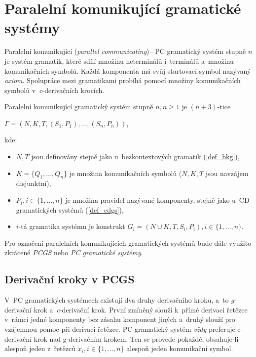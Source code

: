 \section{Paralelní komunikující gramatické systémy}
Paralelní komunikující (\emph{parallel communicating})\,--\,PC gramatický systém stupně $n$ je systém gramatik, které sdílí množinu neterminálů i~terminálů a~množinu komunikačních symbolů.
Každá komponenta má svůj startovací symbol nazývaný \emph{axiom}.
Spolupráce mezi gramatikami probíhá pomocí množiny komunikačních symbolů v~\emph{c}-derivačních krocích.
\begin{definition}
    Paralelní komunikující gramatický systém stupně $n, n \geq 1$ je $(n+3)$-tice
    \begin{center}
        $\Gamma = (N, K, T, (S_1, P_1), \ldots, (S_n, P_n))$,
    \end{center}
    kde:
    \begin{itemize}
        \item $N, T$ jsou definovány stejně jako u~bezkontextových gramatik (\ref{def_bkg}),
        \item $K = \{Q_1, \ldots, Q_n\}$ je množina komunikačních symbolů ($N, K, T$ jsou navzájem disjunktní),
        \item $P_i, i \in \{1, \ldots, n\}$ je množina pravidel nazývané komponenty, stejně jako u~CD gramatických systémů (\ref{def_cdgs}),
        \item $i$-tá gramatika systému je konstrukt $G_i = (N \cup K, T, S_i, P_i), i \in \{1, \ldots, n\}$.
    \end{itemize}
\end{definition}

\begin{convention}
Pro označení paralelních komunikujících gramatických systémů bude dále využito zkrácené \emph{PCGS} nebo \emph{PC gramatické systémy}.
\end{convention}

\subsection*{Derivační kroky v PCGS}

V~PC gramatických systémech existují dva druhy derivačního kroku, a~to \emph{g}-derivační krok a~\emph{c}-derivační krok.
První zmíněný slouží k~přímé derivaci řetězce v~rámci jedné komponenty bez zásahu komponent jiných a~druhý slouží pro vzájemnou pomoc při derivaci řetězce. 
PC gramatický systém \emph{vždy} preferuje c-derivační krok nad g-derivačním krokem.
Ten se provede pokaždé, obsahuje-li alespoň jeden z~řetězců $x_i, i \in \{1, \ldots, n\}$ alespoň jeden komunikační symbol.

